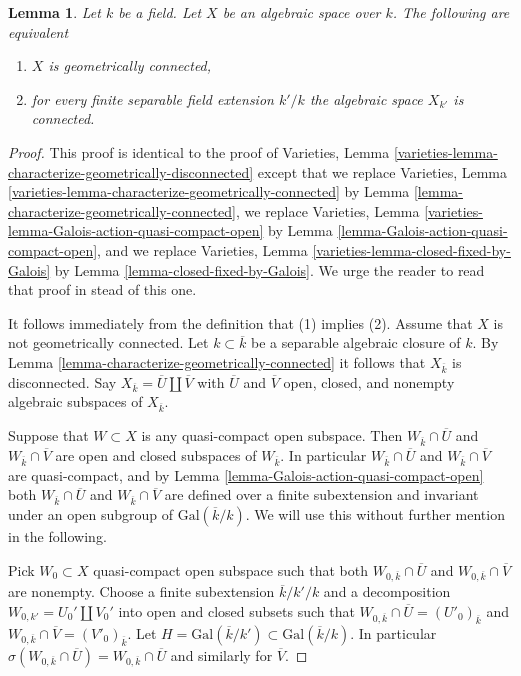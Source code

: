 \documentclass{stacks-project}
\theoremstyle{plain}
\newtheorem{lemma}[subsection]{Lemma}
\theoremstyle{definition}
\theoremstyle{remark}
\numberwithin{equation}{subsection}
\begin{document}
\begin{lemma}
\label{lemma-characterize-geometrically-disconnected}
Let $k$ be a field. Let $X$ be an algebraic space over $k$.
The following are equivalent
\begin{enumerate}
\item $X$ is geometrically connected,
\item for every finite separable field extension $k'/k$
the algebraic space $X_{k'}$ is connected.
\end{enumerate}
\end{lemma}

\begin{proof}
This proof is identical to the proof of
Varieties, Lemma \ref{varieties-lemma-characterize-geometrically-disconnected}
except that
we replace
Varieties, Lemma \ref{varieties-lemma-characterize-geometrically-connected}
by Lemma \ref{lemma-characterize-geometrically-connected},
we replace
Varieties, Lemma \ref{varieties-lemma-Galois-action-quasi-compact-open}
by Lemma \ref{lemma-Galois-action-quasi-compact-open}, and
we replace
Varieties, Lemma \ref{varieties-lemma-closed-fixed-by-Galois}
by Lemma \ref{lemma-closed-fixed-by-Galois}.
We urge the reader to read that proof in stead of this one.

\medskip\noindent
It follows immediately from the definition that (1) implies (2).
Assume that $X$ is not geometrically connected.
Let $k \subset \overline{k}$ be a separable algebraic
closure of $k$. By
Lemma \ref{lemma-characterize-geometrically-connected}
it follows that $X_{\overline{k}}$ is disconnected.
Say $X_{\overline{k}} = \overline{U} \amalg \overline{V}$
with $\overline{U}$ and $\overline{V}$ open, closed, and nonempty
algebraic subspaces of $X_{\overline{k}}$.

\medskip\noindent
Suppose that $W \subset X$ is any quasi-compact open subspace.
Then $W_{\overline{k}} \cap \overline{U}$ and
$W_{\overline{k}} \cap \overline{V}$ are open and closed subspaces of
$W_{\overline{k}}$. In particular $W_{\overline{k}} \cap \overline{U}$ and
$W_{\overline{k}} \cap \overline{V}$ are quasi-compact, and by
Lemma \ref{lemma-Galois-action-quasi-compact-open}
both $W_{\overline{k}} \cap \overline{U}$ and
$W_{\overline{k}} \cap \overline{V}$
are defined over a finite subextension and invariant under an
open subgroup of $\text{Gal}(\overline{k}/k)$.
We will use this without further mention in the following.

\medskip\noindent
Pick $W_0 \subset X$ quasi-compact open subspace such that both
$W_{0, \overline{k}} \cap \overline{U}$ and
$W_{0, \overline{k}} \cap \overline{V}$ are nonempty.
Choose a finite subextension $\overline{k}/k'/k$
and a decomposition $W_{0, k'} = U_0' \amalg V_0'$ into open and closed
subsets such that
$W_{0, \overline{k}} \cap \overline{U} = (U'_0)_{\overline{k}}$ and
$W_{0, \overline{k}} \cap \overline{V} = (V'_0)_{\overline{k}}$.
Let $H = \text{Gal}(\overline{k}/k') \subset \text{Gal}(\overline{k}/k)$.
In particular
$\sigma(W_{0, \overline{k}} \cap \overline{U}) =
W_{0, \overline{k}} \cap \overline{U}$ and similarly for
$\overline{V}$.


\end{proof}
\end{document}

